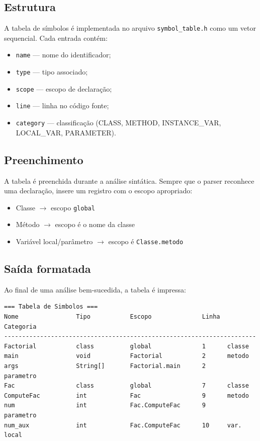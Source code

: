 \documentclass[a4paper, 12pt]{article}
\begin{document}
\subsection{Estrutura}

A tabela de s\'imbolos \'e implementada no arquivo \texttt{symbol\_table.h} como um vetor sequencial. Cada entrada cont\'em:

\begin{itemize}
    \item \texttt{name} --- nome do identificador;
    \item \texttt{type} --- tipo associado;
    \item \texttt{scope} --- escopo de declara\c{c}\~ao;
    \item \texttt{line} --- linha no c\'odigo fonte;
    \item \texttt{category} --- classifica\c{c}\~ao (CLASS, METHOD, INSTANCE\_VAR, LOCAL\_VAR, PARAMETER).
\end{itemize}

\subsection{Preenchimento}

A tabela \'e preenchida durante a an\'alise sint\'atica. Sempre que o parser reconhece uma declara\c{c}\~ao, insere um registro com o escopo apropriado:

\begin{itemize}
    \item Classe $\rightarrow$ escopo \texttt{global}
    \item M\'etodo $\rightarrow$ escopo \'e o nome da classe
    \item Vari\'avel local/par\^ametro $\rightarrow$ escopo \'e \texttt{Classe.metodo}
\end{itemize}

\subsection{Sa\'ida formatada}

Ao final de uma an\'alise bem-sucedida, a tabela \'e impressa:

\begin{lstlisting}[numbers=none]
=== Tabela de Simbolos ===
Nome                Tipo           Escopo              Linha  Categoria
----------------------------------------------------------------------
Factorial           class          global              1      classe
main                void           Factorial           2      metodo
args                String[]       Factorial.main      2      parametro
Fac                 class          global              7      classe
ComputeFac          int            Fac                 9      metodo
num                 int            Fac.ComputeFac      9      parametro
num_aux             int            Fac.ComputeFac      10     var. local
\end{lstlisting}
\end{document}
